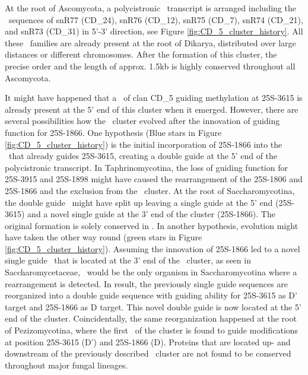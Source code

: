 At the root of Ascomycota, a polycistronic \sno\ transcript is
arranged including the \sno\ sequences of snR77 (CD\_24), snR76
(CD\_12), snR75 (CD\_7), snR74 (CD\_21), and snR73 (CD\_31) in 5'-3'
direction, see Figure \ref{fig:CD_5_cluster_history}.  All these \sno\
families are already present at the root of Dikarya, distributed over
large distances or different chromosomes. After the formation of this
cluster, the precise order and the length of approx. 1.5kb is highly
conserved throughout all Ascomycota.

It might have happened that a \sno\ of clan CD\_5 guiding methylation
at 25S-3615 is already present at the 5' end of this cluster when it
emerged. However, there are several possibilities how the \sno\
cluster evolved after the innovation of guiding function for 25S-1866.
One hypothesis (Blue stars in Figure \ref{fig:CD_5_cluster_history})
is the initial incorporation of 25S-1866 into the \sno\ that already
guides 25S-3615, creating a double guide \sno at the 5' end of the
polycistronic transcript. In Taphrinomycotina, the loss of guiding
function for 25S-3915 and 25S-1898 might have caused the rearrangement
of the 25S-1806 and 25S-1866 and the exclusion from the \sno\
cluster. At the root of Saccharomycotina, the double guide \sno\ might
have split up leaving a single guide at the 5' end (25S-3615) and a
novel single guide at the 3' end of the cluster (25S-1866). The
original formation is solely conserved in \Yli. In another hypothesis,
evolution might have taken the other way round (green stars in Figure
\ref{fig:CD_5_cluster_history}). Assuming the innovation of 25S-1866
led to a novel single guide \sno\ that is located at the 3' end of the
\sno\ cluster, as seen in Saccharomycetaceae, \yli\ would be the only
organism in Saccharomycotina where a rearrangement is detected. In
result, the previously single guide sequences are reorganized into a
double guide sequence with guiding ability for 25S-3615 as D' target
and 25S-1866 as D target. This novel double guide is now located at
the 5' end of the cluster.  Coincidentally, the same reorganization
happened at the root of Pezizomycotina, where the first \sno\ of the
cluster is found to guide modifications at position 25S-3615 (D') and
25S-1866 (D). Proteins that are located up- and downstream of the
previously described \sno\ cluster are not found to be conserved
throughout major fungal lineages.



